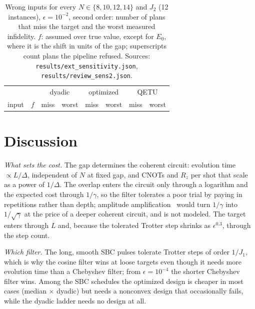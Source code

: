 \documentclass[aps,pra,twocolumn,superscriptaddress,nofootinbib]{revtex4-2}
\begin{document}
\begin{table}[t]
\caption{Wrong inputs for every $N\in\{8,10,12,14\}$ and $J_2$ (12 instances), $\epsilon=10^{-2}$, second order:
number of plans that miss the target and the worst measured infidelity. $f$: assumed over true value, except for $E_0$,
where it is the shift in units of the gap; superscripts count plans the pipeline refused. Sources:
\texttt{results/ext\_sensitivity.json}, \texttt{results/review\_sens2.json}.}
\label{tab:senswide}
\begin{ruledtabular}
\begin{tabular}{lrrrrrrr}
 & & \multicolumn{2}{c}{dyadic} & \multicolumn{2}{c}{optimized} & \multicolumn{2}{c}{QETU}\\
input & $f$ & miss & worst & miss & worst & miss & worst\\
\midrule


\end{tabular}
\end{ruledtabular}
\end{table}

\section{Discussion}
\label{sec:discussion}

\emph{What sets the cost.} The gap determines the coherent circuit: evolution time $\propto L/\Delta$, independent of
$N$ at fixed gap, and CNOTs and $R_z$ per shot that scale as a power of $1/\Delta$. The overlap enters the circuit only
through a logarithm and the expected cost through $1/\gamma$, so the filter tolerates a poor trial by paying in
repetitions rather than depth; amplitude amplification~\cite{Brassard2002,Yoder2014} would turn $1/\gamma$ into
$1/\sqrt\gamma$ at the price of a deeper coherent circuit, and is not modeled. The target enters through $L$ and,
because the tolerated Trotter step shrinks as $\epsilon^{0.3}$, through the step count.

\emph{Which filter.} The long, smooth SBC pulses tolerate Trotter steps of order $1/J_1$, which is why the cosine
filter wins at loose targets even though it needs more evolution time than a Chebyshev filter; from $\epsilon=10^{-4}$
the shorter Chebyshev filter wins. Among the SBC schedules the optimized design is cheaper in most cases (median
\odMMed$\times$ dyadic) but needs a nonconvex design that occasionally fails, while the dyadic ladder needs no design
at all.
\end{document}
